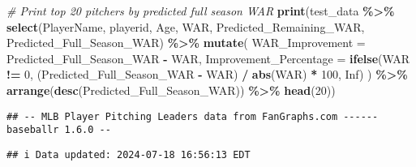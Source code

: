 \documentclass[
]{article}
\newenvironment{Shaded}{\begin{snugshade}}{\end{snugshade}}
\newcommand{\AttributeTok}[1]{\textcolor[rgb]{0.13,0.29,0.53}{#1}}
\newcommand{\CommentTok}[1]{\textcolor[rgb]{0.56,0.35,0.01}{\textit{#1}}}
\newcommand{\ConstantTok}[1]{\textcolor[rgb]{0.56,0.35,0.01}{#1}}
\newcommand{\DecValTok}[1]{\textcolor[rgb]{0.00,0.00,0.81}{#1}}
\newcommand{\FunctionTok}[1]{\textcolor[rgb]{0.13,0.29,0.53}{\textbf{#1}}}
\newcommand{\NormalTok}[1]{#1}
\newcommand{\SpecialCharTok}[1]{\textcolor[rgb]{0.81,0.36,0.00}{\textbf{#1}}}
\begin{document}
\begin{Shaded}
\begin{Highlighting}[]
\CommentTok{\# Print top 20 pitchers by predicted full season WAR}
\FunctionTok{print}\NormalTok{(test\_data }\SpecialCharTok{\%\textgreater{}\%} 
        \FunctionTok{select}\NormalTok{(PlayerName, playerid, Age, WAR, Predicted\_Remaining\_WAR, Predicted\_Full\_Season\_WAR) }\SpecialCharTok{\%\textgreater{}\%} 
        \FunctionTok{mutate}\NormalTok{(}
          \AttributeTok{WAR\_Improvement =}\NormalTok{ Predicted\_Full\_Season\_WAR }\SpecialCharTok{{-}}\NormalTok{ WAR,}
          \AttributeTok{Improvement\_Percentage =} \FunctionTok{ifelse}\NormalTok{(WAR }\SpecialCharTok{!=} \DecValTok{0}\NormalTok{, (Predicted\_Full\_Season\_WAR }\SpecialCharTok{{-}}\NormalTok{ WAR) }\SpecialCharTok{/} \FunctionTok{abs}\NormalTok{(WAR) }\SpecialCharTok{*} \DecValTok{100}\NormalTok{, }\ConstantTok{Inf}\NormalTok{)}
\NormalTok{        ) }\SpecialCharTok{\%\textgreater{}\%}
        \FunctionTok{arrange}\NormalTok{(}\FunctionTok{desc}\NormalTok{(Predicted\_Full\_Season\_WAR)) }\SpecialCharTok{\%\textgreater{}\%}
        \FunctionTok{head}\NormalTok{(}\DecValTok{20}\NormalTok{))}
\end{Highlighting}
\end{Shaded}

\begin{verbatim}
## -- MLB Player Pitching Leaders data from FanGraphs.com ------ baseballr 1.6.0 --
\end{verbatim}

\begin{verbatim}
## i Data updated: 2024-07-18 16:56:13 EDT
\end{verbatim}
\end{document}
